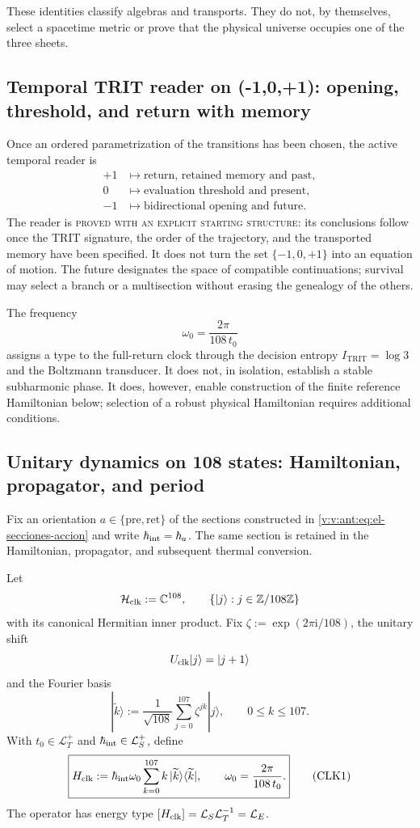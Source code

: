 These identities classify algebras and transports. They do not, by themselves,
select a spacetime metric or prove that the physical universe occupies one
of the three sheets.

\subsection{Temporal TRIT reader on ({-1,0,+1}): opening, threshold, and return with memory}
\label{v:v:rec:sec:lector-temporal-trit}

Once an ordered parametrization of the transitions has been chosen, the active
temporal reader is
\[
\begin{aligned}
 +1&\longmapsto
 \text{return, retained memory and past},\\
 0&\longmapsto
 \text{evaluation threshold and present},\\
 -1&\longmapsto
 \text{bidirectional opening and future}.
\end{aligned}
\]
The reader is \textsc{proved with an explicit starting structure}: its
conclusions follow once the TRIT signature, the order of the
trajectory, and the transported memory have been specified. It does not turn the set
\(\{-1,0,+1\}\) into an equation of motion. The future designates the space
of compatible continuations; survival may select a branch
or a multisection without erasing the genealogy of the others.

The frequency
\[
 \omega_0=\frac{2\pi}{108\,t_0}
\]
assigns a type to the full-return clock through the decision entropy
\(I_{\mathrm{TRIT}}=\log 3\) and the Boltzmann transducer.
It does not, in isolation, establish a stable subharmonic phase. It does, however, enable construction of
the finite reference Hamiltonian below; selection of a robust physical
Hamiltonian requires additional conditions.

\subsection{Unitary dynamics on 108 states: Hamiltonian, propagator, and period}
\label{v:v:rec:sec:hamiltoniano-reloj-108}

Fix an orientation \(a\in\{\mathrm{pre},\mathrm{ret}\}\) of the
sections constructed in \eqref{v:v:ant:eq:el-secciones-accion} and write
\(\hbar_{\rm int}=\hbar_a\). The same section is retained in the
Hamiltonian, propagator, and subsequent thermal conversion.

Let
\[
 \mathcal H_{\rm clk}:=\mathbb C^{108},
 \qquad
 \{|j\rangle:j\in\mathbb Z/108\mathbb Z\}
\]
with its canonical Hermitian inner product. Fix
\(\zeta:=\exp(2\pi\mathrm i/108)\), the unitary shift
\[
 U_{\rm clk}|j\rangle=|j+1\rangle
\]
and the Fourier basis
\[
 |\widetilde k\rangle
 :=\frac1{\sqrt{108}}\sum_{j=0}^{107}\zeta^{jk}|j\rangle,
 \qquad 0\leq k\leq107.
\]
With \(t_0\in\mathcal L_T^+\) and
\(\hbar_{\rm int}\in\mathcal L_S^+\), define
\[
 \boxed{
 H_{\rm clk}
 :=\hbar_{\rm int}\omega_0
 \sum_{k=0}^{107}k\,
 |\widetilde k\rangle\langle\widetilde k|,
 \qquad
 \omega_0=\frac{2\pi}{108\,t_0}.}
 \tag{CLK1}\label{v:v:rec:eq:hamiltoniano-reloj-108}
\]
The operator has energy type
\([H_{\rm clk}]=\mathcal L_S\mathcal L_T^{-1}=\mathcal L_E\).

